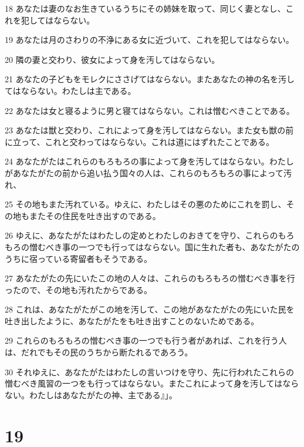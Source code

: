 \par 18 あなたは妻のなお生きているうちにその姉妹を取って、同じく妻となし、これを犯してはならない。
\par 19 あなたは月のさわりの不浄にある女に近づいて、これを犯してはならない。
\par 20 隣の妻と交わり、彼女によって身を汚してはならない。
\par 21 あなたの子どもをモレクにささげてはならない。またあなたの神の名を汚してはならない。わたしは主である。
\par 22 あなたは女と寝るように男と寝てはならない。これは憎むべきことである。
\par 23 あなたは獣と交わり、これによって身を汚してはならない。また女も獣の前に立って、これと交わってはならない。これは道にはずれたことである。
\par 24 あなたがたはこれらのもろもろの事によって身を汚してはならない。わたしがあなたがたの前から追い払う国々の人は、これらのもろもろの事によって汚れ、
\par 25 その地もまた汚れている。ゆえに、わたしはその悪のためにこれを罰し、その地もまたその住民を吐き出すのである。
\par 26 ゆえに、あなたがたはわたしの定めとわたしのおきてを守り、これらのもろもろの憎むべき事の一つでも行ってはならない。国に生れた者も、あなたがたのうちに宿っている寄留者もそうである。
\par 27 あなたがたの先にいたこの地の人々は、これらのもろもろの憎むべき事を行ったので、その地も汚れたからである。
\par 28 これは、あなたがたがこの地を汚して、この地があなたがたの先にいた民を吐き出したように、あなたがたをも吐き出すことのないためである。
\par 29 これらのもろもろの憎むべき事の一つでも行う者があれば、これを行う人は、だれでもその民のうちから断たれるであろう。
\par 30 それゆえに、あなたがたはわたしの言いつけを守り、先に行われたこれらの憎むべき風習の一つをも行ってはならない。またこれによって身を汚してはならない。わたしはあなたがたの神、主である』」。

\chapter{19}

